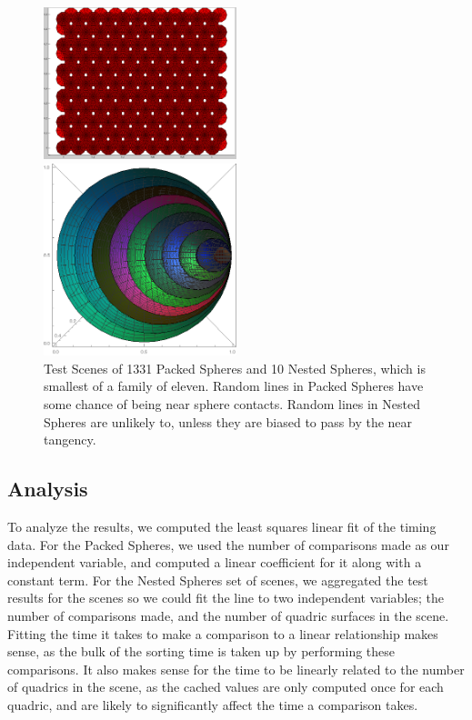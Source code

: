 \documentclass{cccg16}
\begin{document}
\begin{figure}
  \includegraphics[width=0.5\textwidth]{imgs/packedSpheres.png}
  \vspace{5mm}
  
  \includegraphics[width=0.5\textwidth]{imgs/hardEllipsoidsSingle.png}
  \caption{Test Scenes of 1331 Packed Spheres and 10 Nested Spheres,
    which is smallest of a family of eleven.  Random lines in Packed
    Spheres have some chance of being near sphere contacts.  Random
    lines in Nested Spheres are unlikely to, unless they are biased to
    pass by the near tangency.}
  \label{fig:testScenes}
\end{figure}

\subsection{Analysis}
To analyze the results, we computed the least squares linear fit of
the timing data.  For the Packed Spheres, we used the number of
comparisons made as our independent variable, and computed a linear
coefficient for it along with a constant term.  For the Nested Spheres
set of scenes, we aggregated the test results for the scenes so we
could fit the line to two independent variables; the number of
comparisons made, and the number of quadric surfaces in the scene.
Fitting the time it takes to make a comparison to a linear
relationship makes sense, as the bulk of the sorting time is taken up
by performing these comparisons.  It also makes sense for the time to
be linearly related to the number of quadrics in the scene, as the
cached values are only computed once for each quadric, and are likely
to significantly affect the time a comparison takes.
\end{document}
